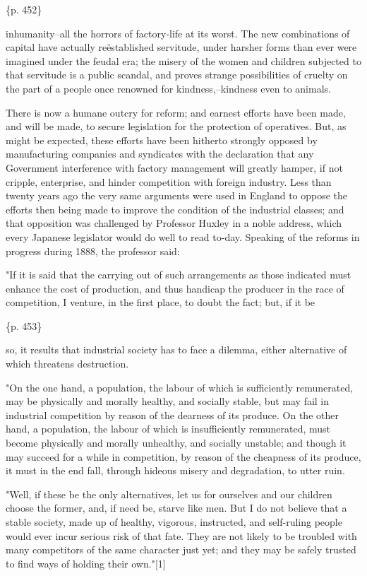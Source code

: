 \{p. 452\}

inhumanity--all the horrors of factory-life at its worst. The new combinations of capital have actually reëstablished servitude, under harsher forms than ever were imagined under the feudal era; the misery of the women and children subjected to that servitude is a public scandal, and proves strange possibilities of cruelty on the part of a people once renowned for kindness,--kindness even to animals.

There is now a humane outcry for reform; and earnest efforts have been made, and will be made, to secure legislation for the protection of operatives. But, as might be expected, these efforts have been hitherto strongly opposed by manufacturing companies and syndicates with the declaration that any Government interference with factory management will greatly hamper, if not cripple, enterprise, and hinder competition with foreign industry. Less than twenty years ago the very same arguments were used in England to oppose the efforts then being made to improve the condition of the industrial classes; and that opposition was challenged by Professor Huxley in a noble address, which every Japanese legislator would do well to read to-day. Speaking of the reforms in progress during 1888, the professor said:

"If it is said that the carrying out of such arrangements as those indicated must enhance the cost of production, and thus handicap the producer in the race of competition, I venture, in the first place, to doubt the fact; but, if it be

\{p. 453\}

so, it results that industrial society has to face a dilemma, either alternative of which threatens destruction.

"On the one hand, a population, the labour of which is sufficiently remunerated, may be physically and morally healthy, and socially stable, but may fail in industrial competition by reason of the dearness of its produce. On the other hand, a population, the labour of which is insufficiently remunerated, must become physically and morally unhealthy, and socially unstable; and though it may succeed for a while in competition, by reason of the cheapness of its produce, it must in the end fall, through hideous misery and degradation, to utter ruin.

"Well, if these be the only alternatives, let us for ourselves and our children choose the former, and, if need be, starve like men. But I do not believe that a stable society, made up of healthy, vigorous, instructed, and self-ruling people would ever incur serious risk of that fate. They are not likely to be troubled with many competitors of the same character just yet; and they may be safely trusted to find ways of holding their own."[1]

